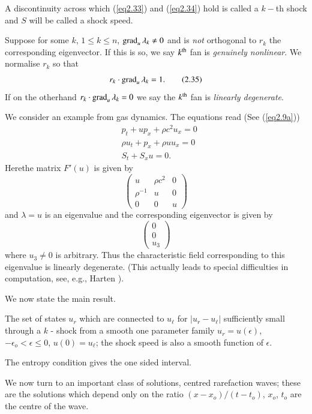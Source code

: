 A discontinuity across which (\ref{eq2.33}) and (\ref{eq2.34}) hold is called a $k-$th shock and $S$ will be called a shock speed.

Suppose for some $k$, $1 \leq k \leq n$, $\operatorname{grad}_u \lambda_k \neq 0$ and is {\em not} orthogonal to $r_k$ the corresponding eigenvector. If this is so, we say $k^{\rm th}$ fan is {\em genuinely nonlinear}. We normalise $r_k$ so that
\begin{equation*}
r_k \cdot \operatorname{grad}_u \lambda_k = 1.  \tag{2.35}\label{eq2.35}
\end{equation*}
If on the otherhand $r_k \cdot \operatorname{grad}_u \lambda_k= 0$ we say the $k^{\rm th}$ fan is {\em linearly degenerate}.

We consider an example from gas dynamics. The equations read (See (\ref{eq2.9a}))
\begin{align*}
& p_t + up_x + \rho c^2 u_x = 0\\
& \rho u_t + p_x + \rho u u_x = 0\\
& S_t + S_x u = 0.
\end{align*}
Here\pageoriginale the matrix $F'(u)$ is given by
$$
\begin{pmatrix}
u & \rho c^2 & 0\\
\rho^{-1} & u & 0\\
0 &  0 &  u
\end{pmatrix}
$$
and $\lambda = u$ is an eigenvalue and the corresponding eigenvector is given by 
$$
\begin{pmatrix}
0\\0\\u_3
\end{pmatrix}
$$
where $u_3 \neq 0$ is arbitrary. Thus the characteristic field corresponding to this eigenvalue is linearly degenerate. (This actually leads to special difficulties in computation, see, e.g., Harten \cite{key17}).

We now state the main result.

\begin{thm}\label{chap2:thm1}
The set of states $u_r$ which are connected to $u_\ell$ for $|u_r - u_\ell|$ sufficiently small through a $k$ - shock from a smooth one parameter family $u_r = u (\epsilon)$, $- \epsilon_o < \epsilon \leq 0$, $u(0) = u_\ell$; the shock speed is also a smooth function of $\epsilon$.
\end{thm}

\begin{remark*}
The entropy condition gives the one sided interval.

We now turn to an important class of solutions, centred rarefaction waves; these are the solutions which depend only on the ratio $(x-x_o)/ (t-t_o)$, $x_o$, $t_o$ are the centre of the wave.
\end{remark*}

